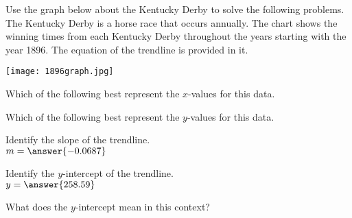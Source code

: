 \documentclass{ximera}
\author{David Kish}
\begin{document}
Use the graph below about the Kentucky Derby to solve the following problems.  The Kentucky Derby is a horse race that occurs annually.  The chart shows the winning times from each Kentucky Derby throughout the years starting with the year 1896. The equation of the trendline is provided in it.

\begin{image}
\texttt{[image: 1896graph.jpg]}
\end{image}



\begin{exercise}
Which of the following best represent the $x$-values for this data.
\begin{multipleChoice}
\end{multipleChoice}
\end{exercise}
\begin{exercise}
Which of the following best represent the $y$-values for this data.
\begin{multipleChoice}
\end{multipleChoice}
\end{exercise}
\begin{exercise}
Identify the slope of the trendline.\\
$m=\answer{-0.0687}$
\end{exercise}
\begin{exercise}
Identify the $y$-intercept of the trendline.\\
$y=\answer{258.59}$
\end{exercise}
\begin{exercise}
What does the $y$-intercept mean in this context?
\begin{multipleChoice}
\end{multipleChoice}
\end{exercise}
\end{document}
